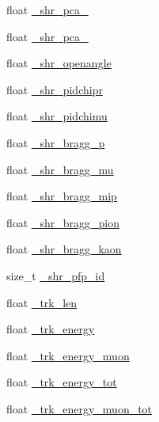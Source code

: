 \begin{DoxyCompactItemize}
\item 
float \hyperlink{classselection_1_1NuMuSelection_a7b9ce353bdf801c126b949d2ababcdef}{\+\_\+shr\+\_\+pca\+\_}
\item 
float \hyperlink{classselection_1_1NuMuSelection_af4069f6356b76cbfb2b2657e70961b63}{\+\_\+shr\+\_\+pca\+\_}
\item 
float \hyperlink{classselection_1_1NuMuSelection_ae0b0231c9373f62ab299817893c3d5f4}{\+\_\+shr\+\_\+openangle}
\item 
float \hyperlink{classselection_1_1NuMuSelection_aaf417a519bc8ecc0d965ac58aff47417}{\+\_\+shr\+\_\+pidchipr}
\item 
float \hyperlink{classselection_1_1NuMuSelection_aba9f56f7c16447322e3108dc91bc3ff0}{\+\_\+shr\+\_\+pidchimu}
\item 
float \hyperlink{classselection_1_1NuMuSelection_af7b55d564aef645da1ff8a1fa0b4e620}{\+\_\+shr\+\_\+bragg\+\_\+p}
\item 
float \hyperlink{classselection_1_1NuMuSelection_aea36ed7e354b16fc1e5ff97cedb23c47}{\+\_\+shr\+\_\+bragg\+\_\+mu}
\item 
float \hyperlink{classselection_1_1NuMuSelection_a418742070b70e6cd789a9dce1572c918}{\+\_\+shr\+\_\+bragg\+\_\+mip}
\item 
float \hyperlink{classselection_1_1NuMuSelection_a965ff03e4cd45fa4a7267f2c4576c99e}{\+\_\+shr\+\_\+bragg\+\_\+pion}
\item 
float \hyperlink{classselection_1_1NuMuSelection_a32142048875e97db40e44f0b4a51eae3}{\+\_\+shr\+\_\+bragg\+\_\+kaon}
\item 
size\+\_\+t \hyperlink{classselection_1_1NuMuSelection_a6a877911df0beda5d7d43149d0535389}{\+\_\+shr\+\_\+pfp\+\_\+id}
\item 
float \hyperlink{classselection_1_1NuMuSelection_ab8df38bd822646f56b672b4f942930a3}{\+\_\+trk\+\_\+len}
\item 
float \hyperlink{classselection_1_1NuMuSelection_a505f81bb9d920d0304d988a2f3fadbc2}{\+\_\+trk\+\_\+energy}
\item 
float \hyperlink{classselection_1_1NuMuSelection_ae223aabae94fb80e1e72b1392ceca16d}{\+\_\+trk\+\_\+energy\+\_\+muon}
\item 
float \hyperlink{classselection_1_1NuMuSelection_a62638e6a70986b1b5ae81a3cd80e4dc3}{\+\_\+trk\+\_\+energy\+\_\+tot}
\item 
float \hyperlink{classselection_1_1NuMuSelection_a09df11b06bf52eef27b8c748707ad991}{\+\_\+trk\+\_\+energy\+\_\+muon\+\_\+tot}
\item 

\end{DoxyCompactItemize}

